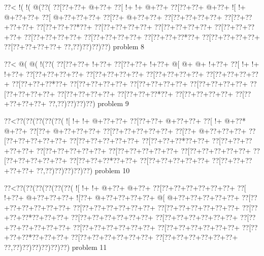 \vbox{\vbox{\goo
\0??<\- !(\- !(\- @(\0??(
\0??[\0??+\0??+\- @+\0??+
\0??[\- !+\- !+\- @+\0??+
\0??[\0??+\0??+\- @+\0??+
\- ![\- !+\- @+\0??+\0??+
\0??[\- @+\0??+\0??+\0??+
\0??[\0??+\- @+\0??+\0??+
\0??[\0??+\0??+\0??+\0??+
\0??[\0??+\0??+\0??+\0??+
\0??[\0??+\0??+\0??*\0??+
\0??[\0??+\0??+\0??+\0??+
\0??[\0??+\0??+\0??+\0??+
\0??[\0??+\0??+\0??+\0??+
\0??[\0??+\0??+\0??+\0??+
\0??[\0??+\0??+\0??+\0??+
\0??[\0??+\0??+\0??*\0??+
\0??[\0??+\0??+\0??+\0??+
\0??[\0??+\0??+\0??+\0??+
\0??,\0??)\0??)\0??)\0??)
}
\hfil problem 8\hfil\break
}

\vbox{\vbox{\goo
\0??<\- @(\- @(\- !(\0??(
\0??[\0??+\0??+\- !+\0??+
\0??[\0??+\0??+\- !+\0??+
\- @[\- @+\- @+\- !+\0??+
\0??[\- !+\- !+\- !+\0??+
\0??[\0??+\0??+\0??+\0??+
\0??[\0??+\0??+\0??+\0??+
\0??[\0??+\0??+\0??+\0??+
\0??[\0??+\0??+\0??+\0??+
\0??[\0??+\0??+\0??*\0??+
\0??[\0??+\0??+\0??+\0??+
\0??[\0??+\0??+\0??+\0??+
\0??[\0??+\0??+\0??+\0??+
\0??[\0??+\0??+\0??+\0??+
\0??[\0??+\0??+\0??+\0??+
\0??[\0??+\0??+\0??*\0??+
\0??[\0??+\0??+\0??+\0??+
\0??[\0??+\0??+\0??+\0??+
\0??,\0??)\0??)\0??)\0??)
}
\hfil problem 9\hfil\break
}

\vbox{\vbox{\goo
\0??<\0??(\0??(\0??(\0??(\0??(
\- ![\- !+\- !+\- @+\0??+\0??+
\0??[\0??+\0??+\- @+\0??+\0??+
\0??[\- !+\- @+\0??*\- @+\0??+
\0??[\0??+\- @+\0??+\0??+\0??+
\0??[\0??+\0??+\0??+\0??+\0??+
\0??[\0??+\- @+\0??+\0??+\0??+
\0??[\0??+\0??+\0??+\0??+\0??+
\0??[\0??+\0??+\0??+\0??+\0??+
\0??[\0??+\0??+\0??*\0??+\0??+
\0??[\0??+\0??+\0??+\0??+\0??+
\0??[\0??+\0??+\0??+\0??+\0??+
\0??[\0??+\0??+\0??+\0??+\0??+
\0??[\0??+\0??+\0??+\0??+\0??+
\0??[\0??+\0??+\0??+\0??+\0??+
\0??[\0??+\0??+\0??*\0??+\0??+
\0??[\0??+\0??+\0??+\0??+\0??+
\0??[\0??+\0??+\0??+\0??+\0??+
\0??,\0??)\0??)\0??)\0??)\0??)
}
\hfil problem 10\hfil\break
}

\vbox{\vbox{\goo
\0??<\0??(\0??(\0??(\0??(\0??(\0??(
\- ![\- !+\- !+\- @+\0??+\- @+\0??+
\0??[\0??+\0??+\0??+\0??+\0??+\0??+
\0??[\- !+\0??+\- @+\0??+\0??+\0??+
\- ![\0??+\- @+\0??+\0??+\0??+\0??+
\- @[\- @+\0??+\0??+\0??+\0??+\0??+
\0??[\0??+\0??+\0??+\0??+\0??+\0??+
\0??[\0??+\0??+\0??+\0??+\0??+\0??+
\0??[\0??+\0??+\0??+\0??+\0??+\0??+
\0??[\0??+\0??+\0??*\0??+\0??+\0??+
\0??[\0??+\0??+\0??+\0??+\0??+\0??+
\0??[\0??+\0??+\0??+\0??+\0??+\0??+
\0??[\0??+\0??+\0??+\0??+\0??+\0??+
\0??[\0??+\0??+\0??+\0??+\0??+\0??+
\0??[\0??+\0??+\0??+\0??+\0??+\0??+
\0??[\0??+\0??+\0??*\0??+\0??+\0??+
\0??[\0??+\0??+\0??+\0??+\0??+\0??+
\0??[\0??+\0??+\0??+\0??+\0??+\0??+
\0??,\0??)\0??)\0??)\0??)\0??)\0??)
}
\hfil problem 11\hfil\break
}

